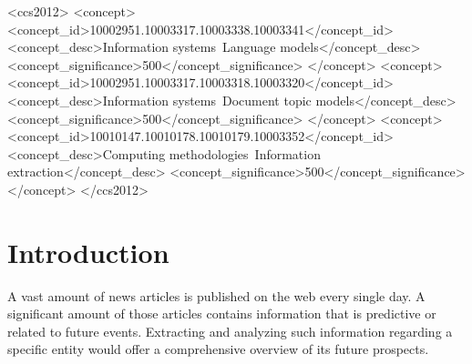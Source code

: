 \documentclass[sigconf]{acmart}
\begin{document}
\begin{CCSXML}
<ccs2012>
   <concept>
       <concept_id>10002951.10003317.10003338.10003341</concept_id>
       <concept_desc>Information systems~Language models</concept_desc>
       <concept_significance>500</concept_significance>
       </concept>
   <concept>
       <concept_id>10002951.10003317.10003318.10003320</concept_id>
       <concept_desc>Information systems~Document topic models</concept_desc>
       <concept_significance>500</concept_significance>
       </concept>
   <concept>
       <concept_id>10010147.10010178.10010179.10003352</concept_id>
       <concept_desc>Computing methodologies~Information extraction</concept_desc>
       <concept_significance>500</concept_significance>
       </concept>
 </ccs2012>
\end{CCSXML}




\maketitle

\newpage

\section{Introduction}
A vast amount of news articles is published on the web every single day. A significant amount of those articles contains information that is predictive or related to future events. Extracting and analyzing such information regarding a specific entity would offer a comprehensive overview of its future prospects.
\end{document}

